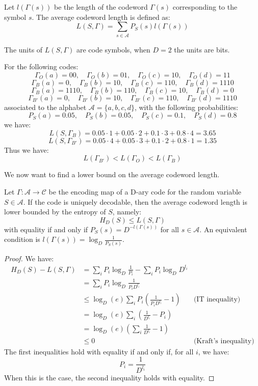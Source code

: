 \begin{definition}
    Let $l(\Gamma(s))$ be the length of the codeword $\Gamma(s)$ corresponding to the symbol $s$. The average codeword length is defined as:
    \[
        L(S, \Gamma) = \sum_{s \in \mathcal{A}} P_S(s) l(\Gamma(s))
    \]
\end{definition}
The units of $L(S, \Gamma)$ are code symbols, when $D = 2$ the units are bits.

\begin{eg}
    For the following codes:
    \[
        \Gamma_O(a) = 00, \quad \Gamma_O(b) = 01, \quad \Gamma_O(c) = 10, \quad \Gamma_O(d) = 11
    \]
    \[
        \Gamma_B(a) = 0, \quad \Gamma_B(b) = 10, \quad \Gamma_B(c) = 110, \quad \Gamma_B(d) = 1110
    \]
    \[
        \Gamma_B(a) = 1110, \quad \Gamma_B(b) = 110, \quad \Gamma_B(c) = 10, \quad \Gamma_B(d) = 0
    \]
    \[
        \Gamma_{B'}(a) = 0, \quad \Gamma_{B'}(b) = 10, \quad \Gamma_{B'}(c) = 110, \quad \Gamma_{B'}(d) = 1110
    \]
    associated to the alphabet $\mathcal{A} = \{a,b,c,d\}$, with the following probabilities:
    \[
        P_S(a) = 0.05, \quad P_S(b) = 0.05, \quad P_S(c) = 0.1, \quad P_S(d) = 0.8
    \]
    we have:
    \[
        L(S, \Gamma_B) = 0.05 \cdot 1 + 0.05 \cdot 2 + 0.1 \cdot 3 + 0.8 \cdot 4 = 3.65
    \]
    \[
        L(S, \Gamma_{B'}) = 0.05 \cdot 4 + 0.05 \cdot 3 + 0.1 \cdot 2 + 0.8 \cdot 1 = 1.35
    \]
    Thus we have:
    \[
        L(\Gamma_{B'}) < L(\Gamma_O) < L(\Gamma_B)
    \]
\end{eg}
We now want to find a lower bound on the average codeword length. 

\begin{theorem}
    Let $\Gamma: \mathcal{A} \to \mathcal{C}$ be the encoding map of a D-ary code for the random variable $S \in \mathcal{A}$. If the code is uniquely decodable, then the average codeword length is lower bounded by the entropy of $S$, namely:
    \[
        H_D(S) \leq L(S, \Gamma)
    \]
    with equality if and only if $P_S(s) = D^{-l(\Gamma(s))}$ for all $s \in \mathcal{A}$. An equivalent condition is $l(\Gamma(s)) = \log_D \frac{1}{P_S(s)}$.
\end{theorem}
\begin{proof}
    We have:
    \begin{align*}
        H_D(S) - L(S, \Gamma) &= \sum_{i} P_i \log_D \frac{1}{P_i} - \sum_{i} P_i \log_D D^{l_i} \\
        &= \sum_{i} P_i \log_D \frac{1}{P_i D^{l_i}} \\
        &\leq \log_D (e) \sum_{i} P_i \left(\frac{1}{P_i D^{l_i}} - 1\right) & \text{(IT inequality)} \\
        &= \log_D (e) \sum_{i} \left(\frac{1}{D^{l_i}} - P_i\right) \\
        &= \log_D (e) \left(\sum_{i} \frac{1}{D^{l_i}} - 1\right) \\
        &\leq 0 & \text{(Kraft's inequality)}
    \end{align*}
    The first inequalities hold with equality if and only if, for all $i$, we have:
    \[
        P_i = \frac{1}{D^{l_i}}
    \]
    When this is the case, the second inequality holds with equality.
\end{proof}

